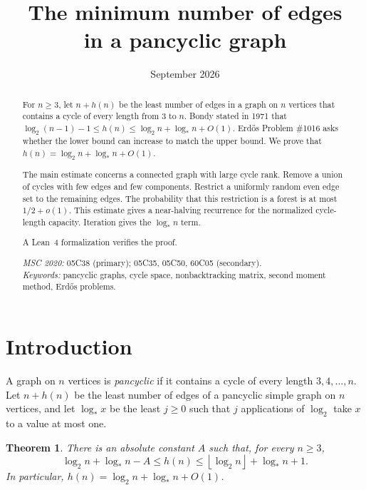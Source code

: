 \documentclass[11pt,a4paper]{article}
\title{\LARGE\bfseries The minimum number of edges\\[4pt] in a pancyclic graph}
\author{\paperauthors}
\date{September 2026}
\numberwithin{equation}{section}
\newtheorem{theorem}{Theorem}[section]
\theoremstyle{definition}
\theoremstyle{remark}
\newcommand{\lstar}{\log_*}
\newcommand{\floor}[1]{\left\lfloor#1\right\rfloor}
\begin{document}
\maketitle
\begin{abstract}
For $n\ge3$, let $n+h(n)$ be the least number of edges in a graph on $n$ vertices that contains a cycle of every length from $3$ to $n$. Bondy stated in 1971 that $\log_2(n-1)-1\le h(n)\le\log_2n+\log_*n+O(1)$. Erd\H{o}s Problem \#1016 asks whether the lower bound can increase to match the upper bound. We prove that $h(n)=\log_2 n+\log_*n+O(1)$.

The main estimate concerns a connected graph with large cycle rank. Remove a union of cycles with few edges and few components. Restrict a uniformly random even edge set to the remaining edges. The probability that this restriction is a forest is at most $1/2+o(1)$. This estimate gives a near-halving recurrence for the normalized cycle-length capacity. Iteration gives the $\log_*n$ term.

A Lean~4 formalization verifies the proof.

\medskip
\noindent\textit{MSC 2020:} 05C38 (primary); 05C35, 05C50, 60C05 (secondary).\\
\textit{Keywords:} pancyclic graphs, cycle space, nonbacktracking matrix, second moment method, Erd\H{o}s problems.
\end{abstract}

{\linespread{1}\selectfont\setcounter{tocdepth}{2}\tableofcontents}
\newpage

\section{Introduction}\label{sec:intro}
A graph on $n$ vertices is \emph{pancyclic} if it contains a cycle of every length $3,4,\ldots,n$. Let $n+h(n)$ be the least number of edges of a pancyclic simple graph on $n$ vertices, and let $\lstar x$ be the least $j\ge0$ such that $j$ applications of $\log_2$ take $x$ to a value at most one.

\begin{theorem}\label{thm:main}
There is an absolute constant $A$ such that, for every $n\ge3$,
\[
 \log_2n+\lstar n-A\le h(n)\le\floor{\log_2n}+\lstar n+1.
\]
In particular, $h(n)=\log_2n+\lstar n+O(1)$.
\end{theorem}
\end{document}
